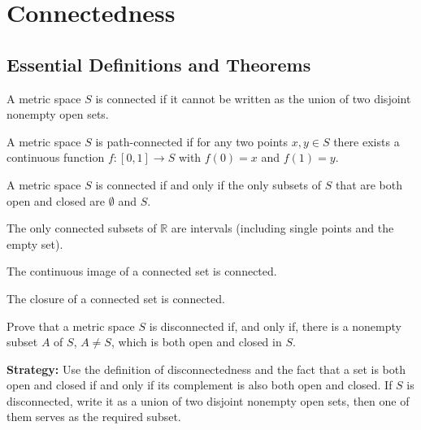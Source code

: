 \section{Connectedness}

\subsection*{Essential Definitions and Theorems}

\begin{definition}
A metric space $S$ is connected if it cannot be written as the union of two disjoint nonempty open sets.
\end{definition}

\begin{definition}
A metric space $S$ is path-connected if for any two points $x,y \in S$ there exists a continuous function $f: [0,1] \to S$ with $f(0) = x$ and $f(1) = y$.
\end{definition}

\begin{theorem}
A metric space $S$ is connected if and only if the only subsets of $S$ that are both open and closed are $\emptyset$ and $S$.
\end{theorem}

\begin{theorem}
The only connected subsets of $\mathbb{R}$ are intervals (including single points and the empty set).
\end{theorem}

\begin{theorem}
The continuous image of a connected set is connected.
\end{theorem}

\begin{theorem}
The closure of a connected set is connected.
\end{theorem}



\begin{problembox}
Prove that a metric space $S$ is disconnected if, and only if, there is a nonempty subset $A$ of $S$, $A \neq S$, which is both open and closed in $S$.
\end{problembox}

\noindent\textbf{Strategy:} Use the definition of disconnectedness and the fact that a set is both open and closed if and only if its complement is also both open and closed. If $S$ is disconnected, write it as a union of two disjoint nonempty open sets, then one of them serves as the required subset.

